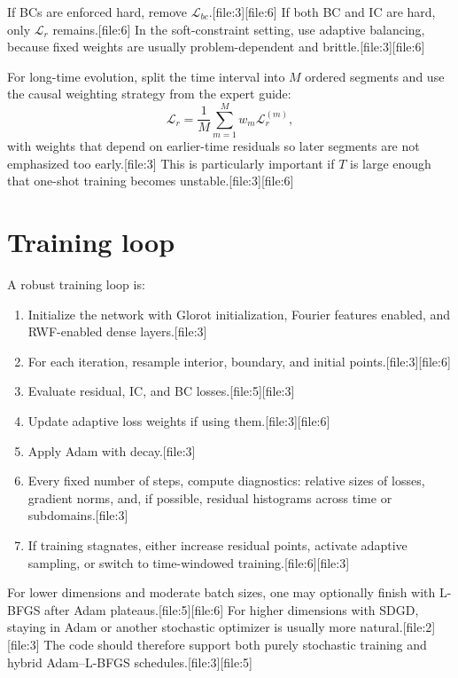 \documentclass[11pt]{report}
\begin{document}
If BCs are enforced hard, remove \(\mathcal{L}_{bc}\).[file:3][file:6]  
If both BC and IC are hard, only \(\mathcal{L}_r\) remains.[file:6]  
In the soft-constraint setting, use adaptive balancing, because fixed weights are usually problem-dependent and brittle.[file:3][file:6]

For long-time evolution, split the time interval into \(M\) ordered segments and use the causal weighting strategy from the expert guide:
\[
\mathcal{L}_r = \frac{1}{M}\sum_{m=1}^M w_m \mathcal{L}_r^{(m)},
\]
with weights that depend on earlier-time residuals so later segments are not emphasized too early.[file:3]  
This is particularly important if \(T\) is large enough that one-shot training becomes unstable.[file:3][file:6]

\section{Training loop}

A robust training loop is:

\begin{enumerate}[label=\arabic*.]
\item Initialize the network with Glorot initialization, Fourier features enabled, and RWF-enabled dense layers.[file:3]
\item For each iteration, resample interior, boundary, and initial points.[file:3][file:6]
\item Evaluate residual, IC, and BC losses.[file:5][file:3]
\item Update adaptive loss weights if using them.[file:3][file:6]
\item Apply Adam with decay.[file:3]
\item Every fixed number of steps, compute diagnostics: relative sizes of losses, gradient norms, and, if possible, residual histograms across time or subdomains.[file:3]
\item If training stagnates, either increase residual points, activate adaptive sampling, or switch to time-windowed training.[file:6][file:3]
\end{enumerate}

For lower dimensions and moderate batch sizes, one may optionally finish with L-BFGS after Adam plateaus.[file:5][file:6]  
For higher dimensions with SDGD, staying in Adam or another stochastic optimizer is usually more natural.[file:2][file:3]  
The code should therefore support both purely stochastic training and hybrid Adam--L-BFGS schedules.[file:3][file:5]
\end{document}
